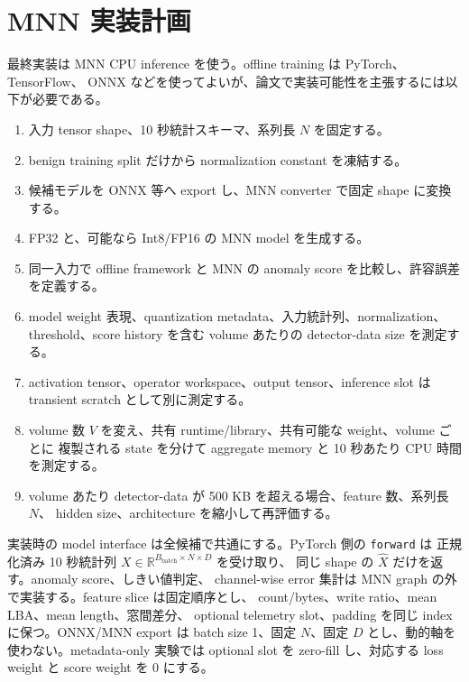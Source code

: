 \section{MNN 実装計画}

最終実装は MNN CPU inference を使う。offline training は PyTorch、TensorFlow、
ONNX などを使ってよいが、論文で実装可能性を主張するには以下が必要である。

\begin{enumerate}
  \item 入力 tensor shape、10 秒統計スキーマ、系列長 $N$ を固定する。
  \item benign training split だけから normalization constant を凍結する。
  \item 候補モデルを ONNX 等へ export し、MNN converter で固定 shape に変換する。
  \item FP32 と、可能なら Int8/FP16 の MNN model を生成する。
  \item 同一入力で offline framework と MNN の anomaly score を比較し、許容誤差を定義する。
  \item model weight 表現、quantization metadata、入力統計列、normalization、
        threshold、score history を含む volume あたりの detector-data size を測定する。
  \item activation tensor、operator workspace、output tensor、inference slot は
        transient scratch として別に測定する。
  \item volume 数 $V$ を変え、共有 runtime/library、共有可能な weight、volume ごとに
        複製される state を分けて aggregate memory と 10 秒あたり CPU 時間を測定する。
  \item volume あたり detector-data が 500 KB を超える場合、feature 数、系列長 $N$、
        hidden size、architecture を縮小して再評価する。
\end{enumerate}

実装時の model interface は全候補で共通にする。PyTorch 側の \texttt{forward} は
正規化済み 10 秒統計列
$X \in \mathbb{R}^{B_{\mathrm{batch}} \times N \times D}$ を受け取り、
同じ shape の $\hat{X}$ だけを返す。anomaly score、しきい値判定、
channel-wise error 集計は MNN graph の外で実装する。feature slice は固定順序とし、
count/bytes、write ratio、mean LBA、mean length、窓間差分、
optional telemetry slot、padding を同じ index に保つ。ONNX/MNN export は
batch size 1、固定 $N$、固定 $D$ とし、動的軸を使わない。metadata-only 実験では
optional slot を zero-fill し、対応する loss weight と score weight を 0 にする。

